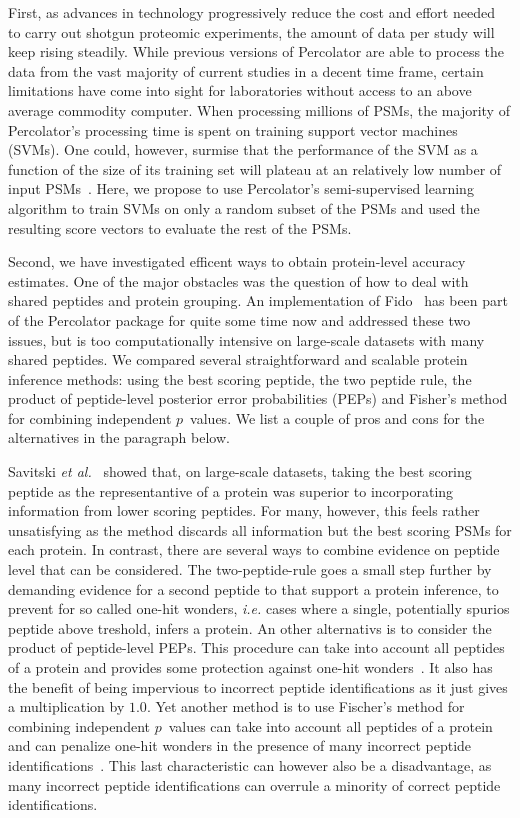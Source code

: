 \documentclass{article}
\begin{document}
First, as advances in technology progressively reduce the cost and
effort needed to carry out shotgun proteomic experiments, the amount
of data per study will keep rising steadily. While previous versions
of Percolator are able to process the data from the vast majority of
current studies in a decent time frame, certain limitations have come
into sight for laboratories without access to an above average
commodity computer. When processing millions of PSMs, the majority of
Percolator’s processing time is spent on training support vector
machines (SVMs). One could, however, surmise that the performance of
the SVM as a function of the size of its training set will plateau at
an relatively low number of input PSMs~\cite{gonnelli2015decoy}. Here,
we propose to use Percolator’s semi-supervised learning algorithm to
train SVMs on only a random subset of the PSMs and used the resulting
score vectors to evaluate the rest of the PSMs.

Second, we have investigated efficent ways to obtain protein-level
accuracy estimates. One of the major obstacles was the question of how
to deal with shared peptides and protein grouping. An implementation
of Fido~\cite{serang2010efficient} has been part of the Percolator
package for quite some time now and addressed these two issues, but is
too computationally intensive on large-scale datasets with many shared
peptides. We compared several straightforward and scalable protein
inference methods: using the best scoring peptide, the two peptide
rule, the product of peptide-level posterior error probabilities
(PEPs) and Fisher’s method for combining independent $p$~values. We
list a couple of pros and cons for the alternatives in the paragraph
below.

Savitski {\em et al.}~\cite{savitski2015scalable} showed that, on
large-scale datasets, taking the best scoring peptide as the
representantive of a protein was superior to incorporating information
from lower scoring peptides. For many, however, this feels rather
unsatisfying as the method discards all information but the best
scoring PSMs for each protein.  In contrast, there are several ways to
combine evidence on peptide level that can be considered. The
two-peptide-rule goes a small step further by demanding evidence for a
second peptide to that support a protein inference, to prevent for so
called one-hit wonders, {\em i.e.} cases where a single, potentially
spurios peptide above treshold, infers a protein. An other alternativs
is to consider the product of peptide-level PEPs. This procedure can
take into account all peptides of a protein and provides some
protection against one-hit wonders~\cite{cox2008maxquant}. It also has
the benefit of being impervious to incorrect peptide identifications
as it just gives a multiplication by $1.0$. Yet another method is to
use Fischer's method for combining independent $p$~values can take
into account all peptides of a protein and can penalize one-hit
wonders in the presence of many incorrect peptide
identifications~\cite{spirin2011assigning,alves2015mass,
  granholm2013determining}. This last characteristic can however also
be a disadvantage, as many incorrect peptide identifications can
overrule a minority of correct peptide identifications.
\end{document}
